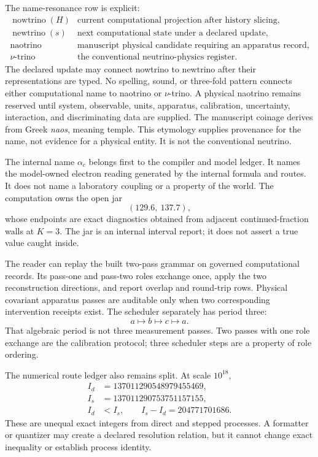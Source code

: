 The name-resonance row is explicit:
\[
\begin{array}{ll}
\operatorname{nowtrino}(H)&\text{current computational projection after history slicing},\\
\operatorname{newtrino}(s)&\text{next computational state under a declared update},\\
\operatorname{naotrino}&\text{manuscript physical candidate requiring an apparatus record},\\
\nu\text{-trino}&\text{the conventional neutrino-physics register}.
\end{array}
\]
The declared update may connect nowtrino to newtrino after their representations are typed.  No spelling, sound, or
three-fold pattern connects either computational name to naotrino or \(\nu\)-trino.  A physical naotrino remains
reserved until system, observable, units, apparatus, calibration, uncertainty, interaction, and discriminating data
are supplied.  The manuscript coinage derives from Greek \emph{naos}, meaning temple.  This etymology supplies
provenance for the name, not evidence for a physical entity.  It is not the conventional neutrino.

The internal name \(\alpha_c\) belongs first to the compiler and model ledger.  It names the model-owned electron
reading generated by the internal formula and routes.  It does not name a laboratory coupling or a property of the
world.  The computation owns the open jar
\[
                         (129.6,\ 137.7),
\]
whose endpoints are exact diagnostics obtained from adjacent continued-fraction walls at \(K=3\).  The jar is an
internal interval report; it does not assert a true value caught inside.

The reader can replay the built two-pass grammar on governed computational records.  Its pass-one and pass-two roles
exchange once, apply the two reconstruction directions, and report overlap and round-trip rows.  Physical covariant
apparatus passes are auditable only when two corresponding intervention receipts exist.  The scheduler separately has
period three:
\[
                         a\mapsto b\mapsto c\mapsto a.
\]
That algebraic period is not three measurement passes.  Two passes with one role exchange are the calibration
protocol; three scheduler steps are a property of role ordering.

The numerical route ledger also remains split.  At scale \(10^{18}\),
\[
\begin{aligned}
I_d&=137011290548979455469,\\
I_s&=137011290753751157155,\\
I_d&<I_s,\qquad I_s-I_d=204771701686.
\end{aligned}
\]
These are unequal exact integers from direct and stepped processes.  A formatter or quantizer may create a declared
resolution relation, but it cannot change exact inequality or establish process identity.

